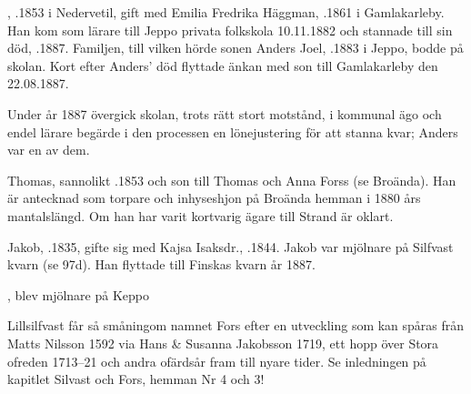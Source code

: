 , .1853 i Nedervetil, gift med Emilia Fredrika Häggman, .1861 i Gamlakarleby. Han kom som lärare till Jeppo privata folkskola 10.11.1882 och stannade till sin död, .1887. Familjen, till vilken hörde sonen Anders Joel, .1883 i Jeppo, bodde på skolan. Kort efter Anders' död flyttade änkan med son till Gamlakarleby den 22.08.1887.

Under år 1887 övergick skolan, trots rätt stort motstånd, i kommunal ägo och endel lärare begärde i den processen en lönejustering för att stanna kvar; Anders var en av dem.


Thomas, sannolikt .1853 och son till Thomas och Anna Forss (se Broända). Han är antecknad som torpare och inhyseshjon på Broända hemman i 1880 års mantalslängd. Om han har varit kortvarig ägare till Strand är oklart.\jhvspace{}


Jakob, .1835, gifte sig med Kajsa Isaksdr., .1844. Jakob var mjölnare på Silfvast kvarn (se 97d). Han flyttade till Finskas kvarn år 1887.
\begin{jhchildren}
  \item {}, blev mjölnare på Keppo
  \item {}
  \item {}
  \item {}
  \item {}
  \item {}
\end{jhchildren}



Lillsilfvast får så småningom namnet Fors efter en utveckling som kan spåras från Matts Nilsson 1592 via Hans \& Susanna Jakobsson 1719, ett hopp över Stora ofreden 1713--21 och andra ofärdsår fram till nyare tider. Se inledningen på kapitlet Silvast och Fors, hemman Nr 4 och 3!




